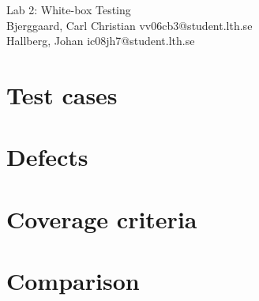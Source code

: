 \documentclass[titlepage]{article}
\begin{document}
\begin{center}
	\huge{Lab 2: White-box Testing } \\
	\small{Bjerggaard, Carl Christian vv06cb3@student.lth.se \\Hallberg, Johan ic08jh7@student.lth.se}

\vspace*{1cm}

\end{center}

\thispagestyle{empty}

\clearpage
\section{Test cases}
\label{testcases}



\section{Defects}
\label{defects}


\section{Coverage criteria}
\label{conclusion}


\section{Comparison}
\label{comparison}

\end{document}
